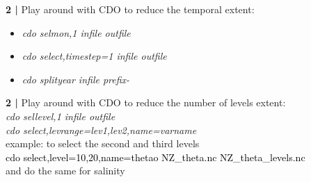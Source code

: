   
\begin{frame}{\textbf{2 |} Play around with CDO} 
    to reduce the temporal extent:
        \vspace{0.3cm}
    \begin{itemize} 
        \item \textit{cdo selmon,1 infile outfile }
            \vspace{0.3cm}
        \item \textit{cdo select,timestep=1  infile outfile }
            \vspace{0.3cm}
         \item \textit{cdo splityear  infile prefix- }
    \end{itemize}
\end{frame}


\begin{frame}{\textbf{2 |} Play around with CDO}
    to reduce the number of levels extent:\\
        \vspace{0.3cm}
    \textit{cdo sellevel,1 infile outfile }\\
        \vspace{0.3cm}
    \textit{cdo select,levrange=lev1,lev2,name=varname}\\
        \vspace{0.5cm}
    example: to select the second and third levels\\
        \vspace{0.5cm}
    \textcolor{black}{cdo select,level=10,20,name=thetao NZ\_theta.nc NZ\_theta\_levels.nc}\\
  \vspace{0.3cm}
        and do the same for salinity
\end{frame}


